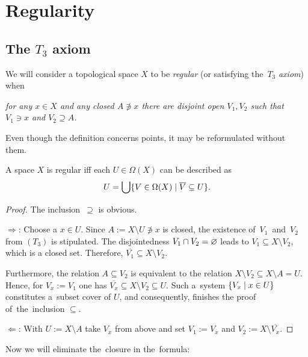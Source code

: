 \chapter{Regularity}

\section{The $T_3$ axiom}

\begin{framed}
  \begin{df}[$T_3$]
    We will consider a topological space $X$ to be \emph{regular\/} (or
    satisfying the~$T_3$ \emph{axiom\/}) when
    \begin{center} \it
      for any $x\in X$ and any closed $A \not\owns x$ there are disjoint open
      $V_1, V_2$ such that $V_1\owns x$ and $V_2\supseteq A$.
    \end{center}
  \end{df}
\end{framed}

Even though the definition concerns points, it may be reformulated without
them.

\begin{prop} \label{topreg-char}
  A space $X$ is regular iff each $U\in \Omega(X)$ can be described as
  \[
    U = \bigcup \{V\in \Omega(X) \mid \overline{V} \subseteq U\}.
  \]
\end{prop}
\begin{proof}
  The inclusion~$\supseteq$ is obvious.

  $\Rightarrow$:
  Choose a $x\in U$.
  Since $A := X\setminus U \not\owns x$ is closed, the existence
  of~$V_1$~and~$V_2$ from $(T_3)$ is stipulated.
  The disjointedness $V_1 \cap V_2 = \varnothing$ leads to $V_1\subseteq X\setminus
  V_2$, which is a closed set.
  Therefore, $\overline{V_1}\subseteq X\setminus V_2$.

  Furthermore, the relation $A\subseteq V_2$ is equivalent to the relation
  $X\setminus V_2\subseteq X \setminus A = U$.
  Hence, for $V_x := V_1$ one has $\overline{V_x}\subseteq X\setminus V_2\subseteq
  U$.
  Such a~system $\{V_x \mid x\in U\}$ constitutes a~subset cover of $U$, and
  consequently, finishes the proof of~the~inclusion $\subseteq$.

  $\Leftarrow$:
  With $U := X\setminus A$ take $V_x$ from above and set $V_1 := V_x$ and $V_2
  := X\setminus \overline{V_x}$.
\end{proof}

Now we will eliminate the~closure in the~formula:

